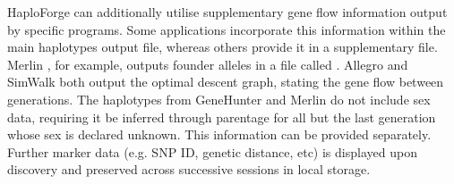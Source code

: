 \documentclass{bioinfo}
\numberwithin{equation}{section}
\def\haplo{{HaploForge}}
\begin{document}
\haplo{} can additionally utilise supplementary gene flow information output by specific programs. Some applications incorporate this information within the main haplotypes output file, whereas others provide it in a supplementary file. Merlin \citep{merlin}, for example, outputs founder alleles in a file called . Allegro \citep{allegro} and SimWalk \citep{simwalk} both output the optimal descent graph, stating the gene flow between generations. The haplotypes from GeneHunter \citep{kruglyak1996} and Merlin do not include sex data, requiring it be inferred through parentage for all but the last generation whose sex is declared unknown. This information can be provided separately. Further marker data (e.g. SNP ID, genetic distance, etc) is displayed upon discovery and preserved across successive sessions in local storage.
\end{document}
